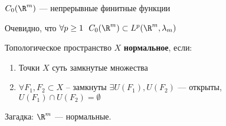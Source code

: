 \begin{obozn}
    \(C_0(\R^m)\) --- непрерывные финитные функции
\end{obozn}

Очевидно, что \(\forall p \geq 1 \ \ C_0(\R^m) \subset L^p(\R^m, \lambda_m)\)

\begin{definition}
    Топологическое пространство \(X\) \textbf{нормальное}, если:
    \begin{enumerate}
        \item Точки \(X\) суть замкнутые множества
        \item \(\forall F_1, F_2 \subset X\) -- замкнуты \(\exists U(F_1), U(F_2)\) --- открыты, \(U(F_1) \cap U(F_2) = \emptyset\)
    \end{enumerate}
\end{definition}

Загадка: \(\R^m\) --- нормальные.

